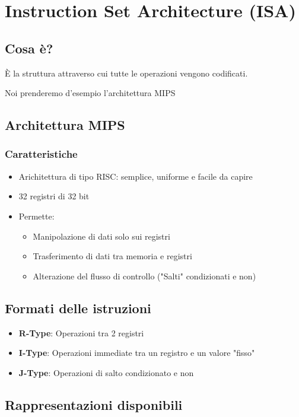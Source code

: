 \chapter{Instruction Set Architecture (ISA)}
\section{Cosa è?}
È la struttura attraverso cui tutte le operazioni vengono codificati.

Noi prenderemo d'esempio l'architettura MIPS

\section{Architettura MIPS}
\subsection{Caratteristiche}
\begin{itemize}
    \item Arichitettura di tipo RISC: semplice, uniforme e facile da capire
    \item 32 registri di 32 bit
    \item Permette:
    \begin{itemize}
        \item Manipolazione di dati solo sui registri
        \item Trasferimento di dati tra memoria e registri
        \item Alterazione del flusso di controllo ("Salti" condizionati e non)
    \end{itemize}
\end{itemize}

\section{Formati delle istruzioni}
\begin{itemize}
    \item \textbf{R-Type}: Operazioni tra 2 registri
    \item \textbf{I-Type}: Operazioni immediate tra un registro e un valore "fisso"
    \item \textbf{J-Type}: Operazioni di salto condizionato e non 
\end{itemize}

\section{Rappresentazioni disponibili}
